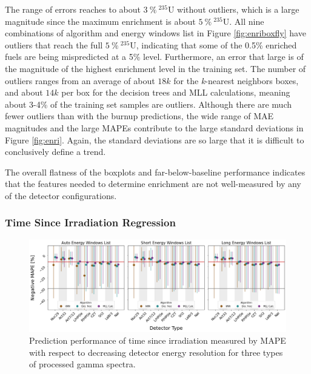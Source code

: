The range of errors reaches to about $3\:\%\:{}^{235}\text{U}$ without
outliers, which is a large magnitude since the maximum enrichment is about
$5\:\%\:{}^{235}\text{U}$. All nine combinations of algorithm and energy
windows list in Figure \ref{fig:enriboxfly} have outliers that reach the full
$5\:\%\:{}^{235}\text{U}$, indicating that some of the 0.5\% enriched fuels are
being mispredicted at a 5\% level.  Furthermore, an error that large is of the
magnitude of the highest enrichment level in the training set.  The number of
outliers ranges from an average of about $18k$ for the \textit{k}-nearest
neighbors boxes, and about $14k$ per box for the decision trees and \gls{MLL}
calculations, meaning about 3-4\% of the training set samples are outliers.
Although there are much fewer outliers than with the burnup predictions, the
wide range of \gls{MAE} magnitudes and the large \gls{MAPE}s contribute to the
large standard deviations in Figure \ref{fig:enri}. Again, the standard
deviations are so large that it is difficult to conclusively define a trend.

The overall flatness of the boxplots and far-below-baseline performance
indicates that the features needed to determine enrichment are not
well-measured by any of the detector configurations. 

\subsubsection{Time Since Irradiation Regression}

\begin{figure}[!htb]
  \centering
  \includegraphics[width=\textwidth]{./chapters/exp2/detector_preds_wrt_enlist_MAPE_cool.png}
  \caption[Prediction performance of time since irradiation regression with 
           decreasing detector energy resolution]
           {Prediction performance of time since irradiation measured by 
           \acrshort{MAPE} with respect to decreasing detector energy resolution
           for three types of processed gamma spectra.}
  \label{fig:cool}
\end{figure}

